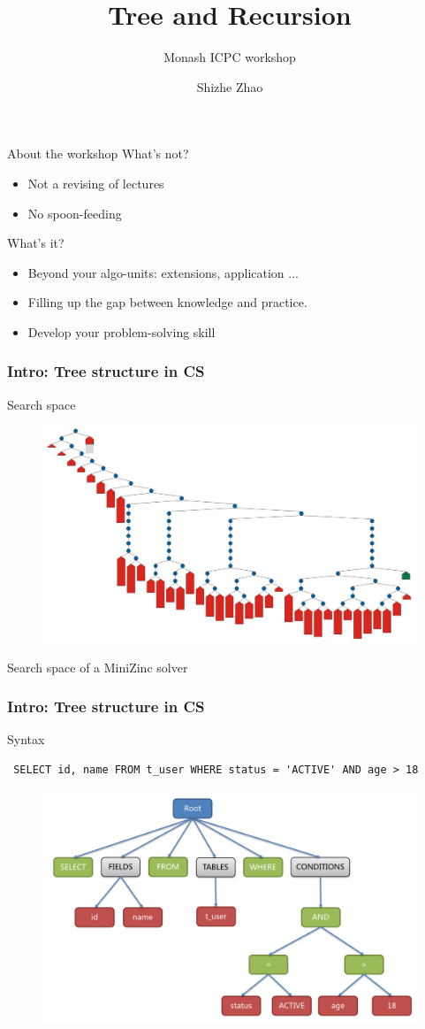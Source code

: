 \documentclass{beamer}
\title[Tree and Recursion]{
  Tree and Recursion
}
\subtitle {Monash ICPC workshop}
\date{}
\author[Shizhe Zhao]{
  Shizhe Zhao
}
\begin{document}

\frame{\titlepage}

\begin{frame}{About the workshop}
  What's not?
  \begin{itemize}
    \item Not a revising of lectures 
    \item No spoon-feeding 
  \end{itemize}

  What's it?
  \begin{itemize}
    \item Beyond your algo-units: extensions, application ...
    \item Filling up the gap between knowledge and practice.
    \item Develop your problem-solving skill
  \end{itemize}
\end{frame}

\begin{frame}
  \frametitle{Intro: Tree structure in CS}
Search space
\begin{figure}[]
  \includegraphics[width=.7\textwidth]{./figs/search-tree.jpg} 
\end{figure}
 \tiny {Search space of a MiniZinc solver}
\end{frame}

\begin{frame}[fragile]
  \frametitle{Intro: Tree structure in CS}
Syntax
\begin{verbatim}
 SELECT id, name FROM t_user WHERE status = 'ACTIVE' AND age > 18
\end{verbatim}
\begin{figure}[]
  \includegraphics[width=.65\textwidth]{./figs/sql_ast.png}
\end{figure}
\end{frame}
\end{document}
